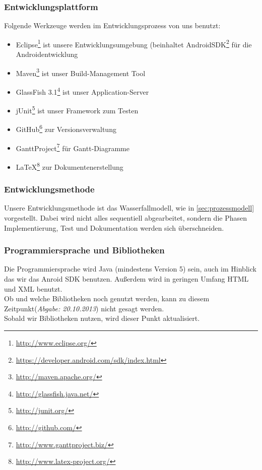 \documentclass[fontsize=12pt,paper=a4,twoside]{scrartcl}
\begin{document}
\subsubsection{Entwicklungsplattform}
Folgende Werkzeuge werden im Entwicklungsprozess von uns benutzt:
\begin{itemize}

\item{Eclipse\footnote{\url{http://www.eclipse.org/}} ist unsere Entwicklungsumgebung (beinhaltet AndroidSDK\footnote{\url{https://developer.android.com/sdk/index.html}} für die Androidentwicklung}
\item{Maven\footnote{\url{http://maven.apache.org/}} ist unser Build-Management Tool}
\item{GlassFish 3.1\footnote{\url{http://glassfish.java.net/}} ist unser Application-Server}
\item{jUnit\footnote{\url{http://junit.org/}} ist unser Framework zum Testen}
\item{GitHub\footnote{\url{http://github.com/}} zur Versionsverwaltung}
\item{GanttProject\footnote{\url{http://www.ganttproject.biz/}}} für Gantt-Diagramme
\item{\LaTeX{}\footnote{\url{http://www.latex-project.org/}}} zur Dokumentenerstellung

\end{itemize}

\subsubsection{Entwicklungsmethode}

Unsere Entwicklungsmethode ist das Wasserfallmodell, wie in \ref{sec:prozessmodell} vorgestellt. Dabei wird nicht alles sequentiell abgearbeitet, sondern die Phasen Implementierung, Test und Dokumentation werden sich überschneiden.

\subsubsection{Programmiersprache und Bibliotheken}
Die Programmiersprache wird Java  (mindestens Version 5) sein, auch im Hinblick das wir das Anroid SDK benutzen. Außerdem wird in geringen Umfang HTML und XML benutzt.\\
Ob und welche Bibliotheken noch genutzt werden, kann zu diesem Zeitpunkt(\emph{Abgabe: 20.10.2013}) nicht gesagt werden.
\\
Sobald wir Bibliotheken nutzen, wird dieser Punkt aktualisiert.
\end{document}
